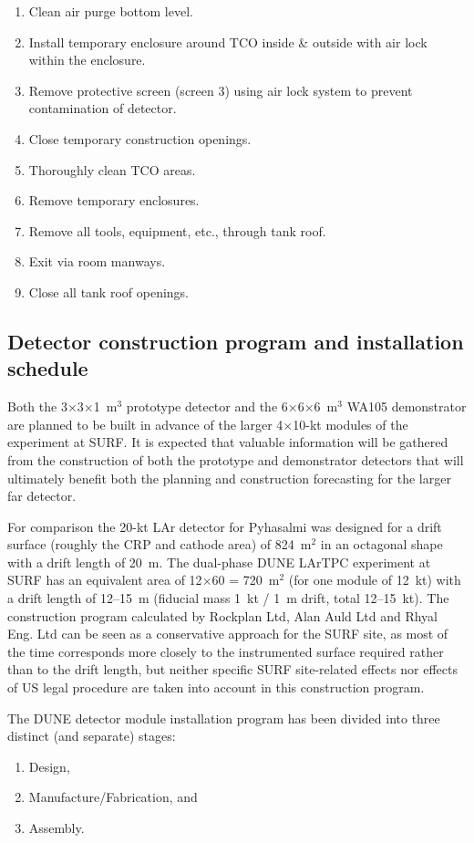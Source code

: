 \begin{enumerate}
\item{Clean air purge bottom level.}
\item{Install temporary enclosure around TCO inside \& outside with air lock within the enclosure.}
\item{ Remove protective screen (screen 3) using air lock system to prevent contamination of detector}.
\item{Close temporary construction openings.}
\item{Thoroughly clean TCO areas.}
\item{Remove temporary enclosures.}
\item{Remove all tools, equipment, etc., through tank roof.}
\item{Exit via room manways.}
\item{Close all tank roof openings.}
\end{enumerate}

\subsection{Detector construction program and installation schedule}

Both the 3$\times$3$\times$1~m$^3$ prototype detector and the
6$\times$6$\times$6~m$^3$ WA105 demonstrator are planned to be built in
advance of the larger 4$\times$10-kt modules of the experiment at
SURF. It is expected that valuable information will be gathered
from the construction of both the prototype and demonstrator detectors
that will ultimately benefit both the planning and construction
forecasting for the larger far detector. 

For comparison the 20-kt LAr detector for Pyhasalmi was designed for a
drift surface (roughly the CRP and cathode area) of 824~m$^2$ in an
octagonal shape with a drift length of 20~m. The dual-phase DUNE
LArTPC experiment at SURF has an equivalent area of 12$\times$60 =
720~m$^2$ (for one module of 12~kt) with a drift length of 12--15~m
(fiducial mass 1~kt / 1~m drift, total 12--15~kt). The construction
program calculated by Rockplan Ltd, Alan Auld Ltd and Rhyal Eng. Ltd
can be seen as a conservative approach for the SURF site, as most
of the time corresponds more closely to
the instrumented surface required  rather than to 
the drift length, but neither specific SURF site-related
effects nor effects of US legal procedure are  taken into account
in this construction program.

The DUNE detector module installation program has been divided into three distinct (and separate)
stages:
\begin{enumerate}
\item{Design,}
\item{Manufacture/Fabrication, and} 
\item{Assembly.}
\end{enumerate}  

